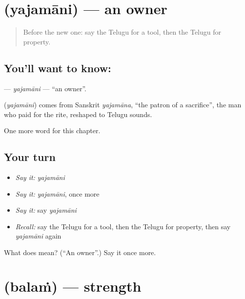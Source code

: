 \section[\texorpdfstring{\te{యజమాని} (yajamāni)}{యజమాని (yajamāni)}]{ (yajamāni) — an owner}

\label{lesson:TE-C106-yajamani}



\begin{quote}
Before the new one: say the Telugu for a tool, then the Telugu for property.
\end{quote}

\subsection*{You'll want to know: }
\textbf{} — \emph{yajamāni} — \textquotedblleft{}an owner\textquotedblright{}.

\begin{cousinweb}
\textbf{} (\emph{yajamāni}) comes from Sanskrit \emph{yajamāna}, \textquotedblleft{}the patron of a sacrifice\textquotedblright{}, the man who paid for the rite, reshaped to Telugu sounds.
\end{cousinweb}

\begin{grammarlens}[title={What you've built}]
One more word for this chapter.
\end{grammarlens}

\subsection*{Your turn}
\begin{itemize}
\raggedright
  \item \emph{Say it:} \emph{yajamāni}
  \item \emph{Say it:} \emph{yajamāni}, once more
  \item \emph{Say it:} say \emph{yajamāni}
  \item \emph{Recall:} say the Telugu for a tool, then the Telugu for property, then say \emph{yajamāni} again
\end{itemize}

\begin{tcolorbox}[breakable,colback=teal!4,colframe=teal!35!black,title={Before you move on}]
What does  mean? (\textquotedblleft{}An owner\textquotedblright{}.) Say it once more.
\end{tcolorbox}
\section[\texorpdfstring{\te{బలం} (balaṁ)}{బలం (balaṁ)}]{ (balaṁ) — strength}

